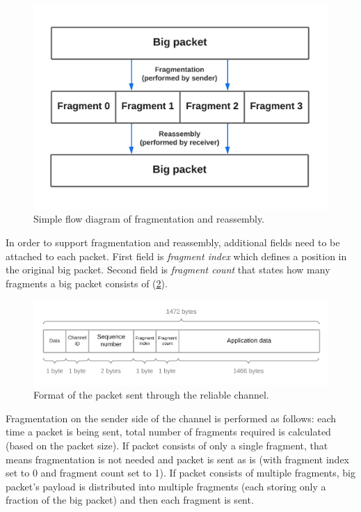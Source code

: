 \documentclass[times, utf8, diplomski]{fer}
\begin{document}
\begin{figure}[H]
	\centering
	\includegraphics[scale=0.3]{Fragmentation-and-reassembly}
	\caption{Simple flow diagram of fragmentation and reassembly.}
	\label{fig:fragmentation-and-reassembly}
\end{figure}

In order to support fragmentation and reassembly, additional fields need to be attached to each packet. First field is \textit{fragment index} which defines a position in the original big packet. Second field is \textit{fragment count} that states how many fragments a big packet consists of (\ref{fig:reliable-packet-structure}).

\begin{figure}[H]
	\centering
	\includegraphics[scale=0.2]{Reliable-packet-structure}
	\caption{Format of the packet sent through the reliable channel.}
	\label{fig:reliable-packet-structure}
\end{figure}

Fragmentation on the sender side of the channel is performed as follows: each time a packet is being sent, total number of fragments required is calculated (based on the packet size). If packet consists of only a single fragment, that means fragmentation is not needed and packet is sent as is (with fragment index set to 0 and fragment count set to 1). If packet consists of multiple fragments, big packet's payload is distributed into multiple fragments (each storing only a fraction of the big packet) and then each fragment is sent. \\
\end{document}
